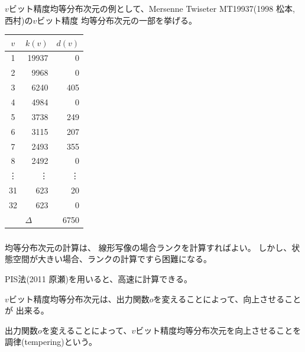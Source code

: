 \documentclass[cjk, dvips, handout, trans, xcolor=dvipsnames]{beamer}
\begin{document}
\begin{frame}[t]
  \frametitle{\insertsubsection}
  $v$ビット精度均等分布次元の例として、Mersenne Twiseter
  MT19937\cite{MT}(1998 松本,西村)の$v$ビット精度
  均等分布次元の一部を挙げる。

  \begin{table}
    \begin{center}
      \begin{tabular}{crr} \hline
        $v$ & $k(v)$ & $d(v)$ \\ \hline
        1 & 19937 & 0 \\
        2 & 9968 & 0 \\
        3 & 6240 & 405 \\
        4 & 4984 & 0 \\
        5 & 3738 & 249 \\
        6 & 3115 & 207 \\
        7 & 2493 & 355 \\
        8 & 2492 & 0 \\
        \vdots & \vdots & \vdots \\
        31 & 623 & 20 \\
        32 & 623 & 0 \\ \hline
        \multicolumn{2}{c}{$\Delta$}& 6750 \\
        \hline
      \end{tabular}
    \end{center}
  \end{table}
\end{frame}

\begin{frame}[t]
  \frametitle{\insertsubsection}

  均等分布次元の計算は、
  線形写像の場合ランクを計算すればよい。
  しかし、状態空間が大きい場合、ランクの計算ですら困難になる。

  PIS法\cite{PIS}(2011 原瀬)を用いると、高速に計算できる。

  $v$ビット精度均等分布次元は、出力関数$o$を変えることによって、向上させることが
  出来る。

  出力関数$o$を変えることによって、$v$ビット精度均等分布次元を向上させることを
  調律(tempering)という。
\end{frame}
\end{document}
